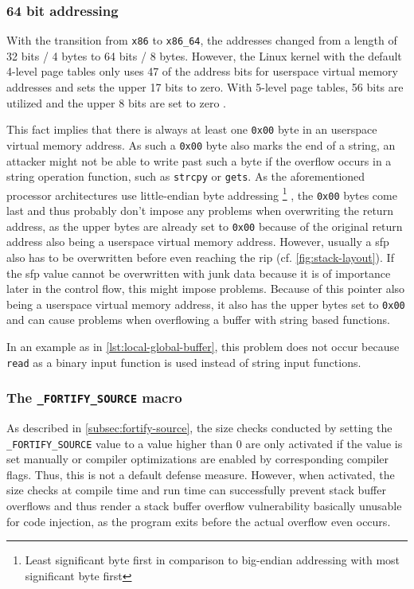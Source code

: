 \subsubsection{64 bit addressing}
\label{subsubsec:ci-64bit-addressing}

With the transition from \texttt{x86} to \texttt{x86\_64}, the addresses changed from a length of 32 bits / 4 bytes to 64 bits / 8 bytes.
However, the Linux kernel with the default 4-level page tables only uses 47 of the address bits for userspace virtual memory addresses and sets the upper 17 bits to zero.
With 5-level page tables, 56 bits are utilized and the upper 8 bits are set to zero \cite{Kernel2020}.

This fact implies that there is always at least one \texttt{0x00} byte in an userspace virtual memory address.
As such a \texttt{0x00} byte also marks the end of a string, an attacker might not be able to write past such a byte if the overflow occurs in a string operation function, such as \texttt{strcpy} or \texttt{gets}.
As the aforementioned processor architectures use little-endian byte addressing%
	\footnote{Least significant byte first in comparison to big-endian addressing with most significant byte first}%
, the \texttt{0x00} bytes come last and thus probably don't impose any problems when overwriting the return address, as the upper bytes are already set to \texttt{0x00} because of the original return address also being a userspace virtual memory address. 
However, usually a \gls{sfp} also has to be overwritten before even reaching the \gls{rip} (cf. \cref{fig:stack-layout}).
If the \gls{sfp} value cannot be overwritten with junk data because it is of importance later in the control flow, this might impose problems.
Because of this pointer also being a userspace virtual memory address, it also has the upper bytes set to \texttt{0x00} and can cause problems when overflowing a buffer with string based functions.

In an example as in \cref{lst:local-global-buffer}, this problem does not occur because \texttt{read} as a binary input function is used instead of string input functions.

\subsubsection{The \texttt{\_FORTIFY\_SOURCE} macro}
\label{subsubsec:ci-fortify-source}

As described in \cref{subsec:fortify-source}, the size checks conducted by setting the \texttt{\_FORTIFY\linebreak[0]\_SOURCE} value to a value higher than 0 are only activated if the value is set manually or compiler optimizations are enabled by corresponding compiler flags.
Thus, this is not a default defense measure.
However, when activated, the size checks at compile time and run time can successfully prevent stack buffer overflows and thus render a stack buffer overflow vulnerability basically unusable for code injection, as the program exits before the actual overflow even occurs.

